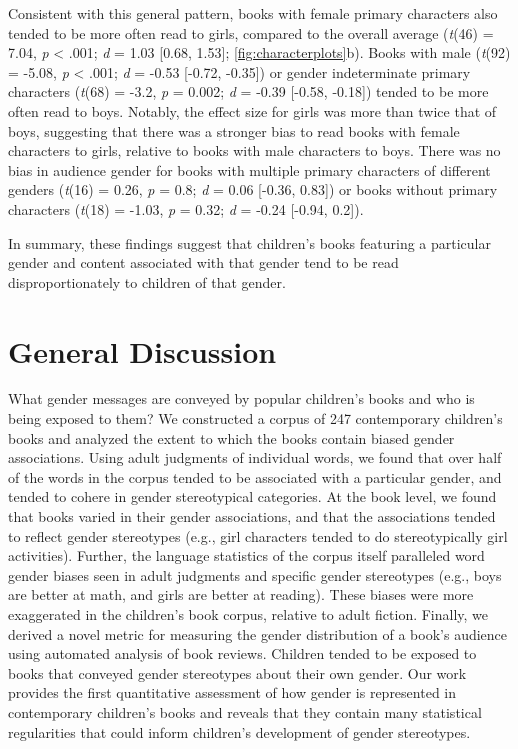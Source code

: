 \documentclass[
  english,
  ,man,floatsintext]{apa6}
\begin{document}
Consistent with this general pattern, books with female primary characters also tended to be more often read to girls, compared to the overall average (\emph{t}(46) = 7.04, \emph{p} \textless{} .001; \emph{d} = 1.03 {[}0.68, 1.53{]}; \autoref{fig:characterplots}b). Books with male (\emph{t}(92) = -5.08, \emph{p} \textless{} .001; \emph{d} = -0.53 {[}-0.72, -0.35{]}) or gender indeterminate primary characters (\emph{t}(68) = -3.2, \emph{p} = 0.002; \emph{d} = -0.39 {[}-0.58, -0.18{]}) tended to be more often read to boys. Notably, the effect size for girls was more than twice that of boys, suggesting that there was a stronger bias to read books with female characters to girls, relative to books with male characters to boys. There was no bias in audience gender for books with multiple primary characters of different genders (\emph{t}(16) = 0.26, \emph{p} = 0.8; \emph{d} = 0.06 {[}-0.36, 0.83{]}) or books without primary characters (\emph{t}(18) = -1.03, \emph{p} = 0.32; \emph{d} = -0.24 {[}-0.94, 0.2{]}).

In summary, these findings suggest that children's books featuring a particular gender and content associated with that gender tend to be read disproportionately to children of that gender.

\hypertarget{general-discussion}{%
\section{General Discussion}\label{general-discussion}}

What gender messages are conveyed by popular children's books and who is being exposed to them? We constructed a corpus of 247 contemporary children's books and analyzed the extent to which the books contain biased gender associations. Using adult judgments of individual words, we found that over half of the words in the corpus tended to be associated with a particular gender, and tended to cohere in gender stereotypical categories. At the book level, we found that books varied in their gender associations, and that the associations tended to reflect gender stereotypes (e.g., girl characters tended to do stereotypically girl activities). Further, the language statistics of the corpus itself paralleled word gender biases seen in adult judgments and specific gender stereotypes (e.g., boys are better at math, and girls are better at reading). These biases were more exaggerated in the children's book corpus, relative to adult fiction. Finally, we derived a novel metric for measuring the gender distribution of a book's audience using automated analysis of book reviews. Children tended to be exposed to books that conveyed gender stereotypes about their own gender. Our work provides the first quantitative assessment of how gender is represented in contemporary children's books and reveals that they contain many statistical regularities that could inform children's development of gender stereotypes.
\end{document}
